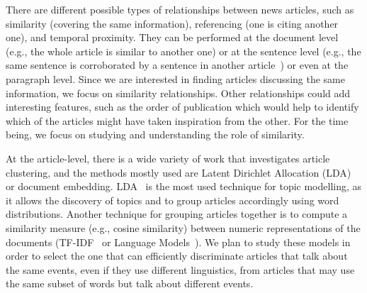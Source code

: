 There are different possible types of relationships between news articles, such as similarity (covering the same information), referencing (one is citing another one), and temporal proximity. They can be performed at the document level (e.g., the whole article is similar to another one) or at the sentence level (e.g., the same sentence is corroborated by a sentence in another article~\cite{bountouridis2018explaining}) or even at the paragraph level.
Since we are interested in finding articles discussing the same information, we focus on similarity relationships.
Other relationships could add interesting features, such as the order of publication which would help to identify which of the articles might have taken inspiration from the other. For the time being, we focus on studying and understanding the role of similarity.

At the article-level, there is a wide variety of work that investigates article clustering, and the methods mostly used are Latent Dirichlet Allocation (LDA) or document embedding.
LDA~\cite{blei2003latent} is the most used technique for topic modelling, as it allows the discovery of topics and to group articles accordingly using word distributions.
Another technique for grouping articles together is to compute a similarity measure (e.g., cosine similarity) between numeric representations of the documents (TF-IDF~\cite{jones1972statistical} or Language Models~\cite{devlin2018bert,cer2018universal,yang2019xlnet}).
We plan to study these models in order to select the one that can efficiently discriminate articles that talk about the same events, even if they use different linguistics, from articles that may use the same subset of words but talk about different events. 


